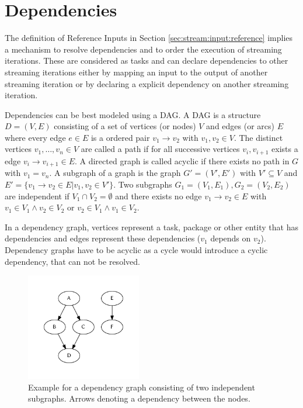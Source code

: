 	\section{Dependencies}
		\label{sec:stream:dependencies}
		The definition of Reference Inputs in Section \ref{sec:stream:input:reference} implies a mechanism to resolve dependencies and to order the execution of streaming iterations. These are considered as tasks and can declare dependencies to other streaming iterations either by mapping an input to the output of another streaming iteration or by declaring a explicit dependency on another streaming iteration.

		Dependencies can be best modeled using a \ac{DAG}. A \ac{DAG} is a structure $D=(V, E)$ consisting of a set of vertices (or nodes) $V$ and edges (or arcs) $E$ where every edge $e\in E$ is a ordered pair $v_1 \rightarrow v_2$ with $v_1, v_2 \in V$. The distinct vertices $v_1,\dots,v_n\in V$ are called a path if for all successive vertices $v_i, v_{i+1}$ exists a edge $v_i \rightarrow v_{i+1} \in E$. A directed graph is called acyclic if there exists no path in $G$ with $v_1 = v_n$. A subgraph of a graph is the graph $G' = (V', E')$ with $V'\subseteq V$ and $E' = \{v_1 \rightarrow v_2 \in E | v_1, v_2\in V'\}$. Two subgraphs $G_1 = (V_1, E_1), G_2 = (V_2, E_2)$ are independent if $V_1 \cap V_2 = \emptyset$ and there exists no edge $v_1\rightarrow v_2\in E$ with $v_1\in V_1 \wedge v_2\in V_2$ or $v_2\in V_1 \wedge v_1\in V_2$.

		In a dependency graph, vertices represent a task, package or other entity that has dependencies and edges represent these dependencies ($v_1$ depends on $v_2$). Dependency graphs have to be acyclic as a cycle would introduce a cyclic dependency, that can not be resolved.

		\begin{figure}[!htb]
			\centering
			\includegraphics[width=0.44694533762057875\textwidth]{figures/unordered-graph.pdf} %
			\caption{\label{fig:graph:unordered}Example for a dependency graph consisting of two independent subgraphs. Arrows denoting a dependency between the nodes.}
		\end{figure}

